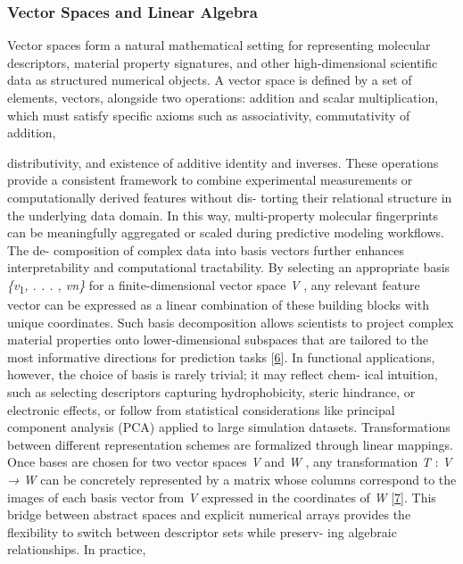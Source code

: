 \documentclass[
]{article}
\begin{document}
\subsubsection{Vector Spaces and Linear
Algebra}\label{vector-spaces-and-linear-algebra}

Vector spaces form a natural mathematical setting for representing
molecular descriptors, material property signatures, and other
high-dimensional scientific data as structured numerical objects. A
vector space is defined by a set of elements, vectors, alongside two
operations: addition and scalar multiplication, which must satisfy
specific axioms such as associativity, commutativity of addition,

distributivity, and existence of additive identity and inverses. These
operations provide a consistent framework to combine experimental
measurements or computationally derived features without dis- torting
their relational structure in the underlying data domain. In this way,
multi-property molecular fingerprints can be meaningfully aggregated or
scaled during predictive modeling workflows. The de- composition of
complex data into basis vectors further enhances interpretability and
computational tractability. By selecting an appropriate basis
\emph{\{v}\textsubscript{1}\emph{, . . . , vn\}} for a
finite-dimensional vector space \emph{V} , any relevant feature vector
can be expressed as a linear combination of these building blocks with
unique coordinates. Such basis decomposition allows scientists to
project complex material properties onto lower-dimensional subspaces
that are tailored to the most informative directions for prediction
tasks {[}\hyperref[_bookmark46]{6}{]}. In functional applications,
however, the choice of basis is rarely trivial; it may reflect chem-
ical intuition, such as selecting descriptors capturing hydrophobicity,
steric hindrance, or electronic effects, or follow from statistical
considerations like principal component analysis (PCA) applied to large
simulation datasets. Transformations between different representation
schemes are formalized through linear mappings. Once bases are chosen
for two vector spaces \emph{V} and \emph{W} , any transformation
\emph{T} : \emph{V → W} can be concretely represented by a matrix whose
columns correspond to the images of each basis vector from \emph{V}
expressed in the coordinates of \emph{W}
{[}\hyperref[_bookmark47]{7}{]}. This bridge between abstract spaces and
explicit numerical arrays provides the flexibility to switch between
descriptor sets while preserv- ing algebraic relationships. In practice,
\end{document}
